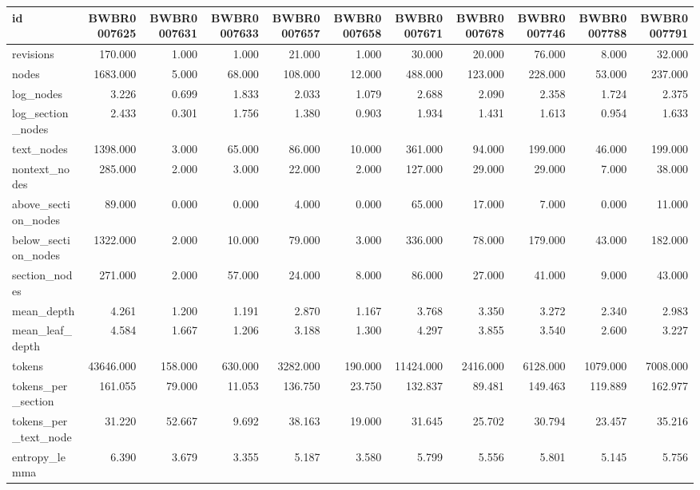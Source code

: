 \begin{tabular}{lrrrrrrrrrr}
\toprule
id & BWBR0007625 & BWBR0007631 & BWBR0007633 & BWBR0007657 & BWBR0007658 & BWBR0007671 & BWBR0007678 & BWBR0007746 & BWBR0007788 & BWBR0007791 \\
\midrule
revisions & 170.000 & 1.000 & 1.000 & 21.000 & 1.000 & 30.000 & 20.000 & 76.000 & 8.000 & 32.000 \\
\cline{1-11}
nodes & 1683.000 & 5.000 & 68.000 & 108.000 & 12.000 & 488.000 & 123.000 & 228.000 & 53.000 & 237.000 \\
\cline{1-11}
log\_nodes & 3.226 & 0.699 & 1.833 & 2.033 & 1.079 & 2.688 & 2.090 & 2.358 & 1.724 & 2.375 \\
\cline{1-11}
log\_section\_nodes & 2.433 & 0.301 & 1.756 & 1.380 & 0.903 & 1.934 & 1.431 & 1.613 & 0.954 & 1.633 \\
\cline{1-11}
text\_nodes & 1398.000 & 3.000 & 65.000 & 86.000 & 10.000 & 361.000 & 94.000 & 199.000 & 46.000 & 199.000 \\
\cline{1-11}
nontext\_nodes & 285.000 & 2.000 & 3.000 & 22.000 & 2.000 & 127.000 & 29.000 & 29.000 & 7.000 & 38.000 \\
\cline{1-11}
above\_section\_nodes & 89.000 & 0.000 & 0.000 & 4.000 & 0.000 & 65.000 & 17.000 & 7.000 & 0.000 & 11.000 \\
\cline{1-11}
below\_section\_nodes & 1322.000 & 2.000 & 10.000 & 79.000 & 3.000 & 336.000 & 78.000 & 179.000 & 43.000 & 182.000 \\
\cline{1-11}
section\_nodes & 271.000 & 2.000 & 57.000 & 24.000 & 8.000 & 86.000 & 27.000 & 41.000 & 9.000 & 43.000 \\
\cline{1-11}
mean\_depth & 4.261 & 1.200 & 1.191 & 2.870 & 1.167 & 3.768 & 3.350 & 3.272 & 2.340 & 2.983 \\
\cline{1-11}
mean\_leaf\_depth & 4.584 & 1.667 & 1.206 & 3.188 & 1.300 & 4.297 & 3.855 & 3.540 & 2.600 & 3.227 \\
\cline{1-11}
tokens & 43646.000 & 158.000 & 630.000 & 3282.000 & 190.000 & 11424.000 & 2416.000 & 6128.000 & 1079.000 & 7008.000 \\
\cline{1-11}
tokens\_per\_section & 161.055 & 79.000 & 11.053 & 136.750 & 23.750 & 132.837 & 89.481 & 149.463 & 119.889 & 162.977 \\
\cline{1-11}
tokens\_per\_text\_node & 31.220 & 52.667 & 9.692 & 38.163 & 19.000 & 31.645 & 25.702 & 30.794 & 23.457 & 35.216 \\
\cline{1-11}
entropy\_lemma & 6.390 & 3.679 & 3.355 & 5.187 & 3.580 & 5.799 & 5.556 & 5.801 & 5.145 & 5.756 \\

\end{tabular}
